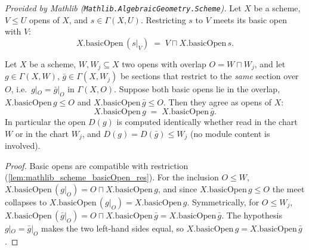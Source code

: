 \begin{lemma}
  \label{lem:mathlib_scheme_basicOpen_res}
  \mathlibok
  \textit{Provided by Mathlib (\texttt{Mathlib.AlgebraicGeometry.Scheme}).}
  Let \(X\) be a scheme, \(V \le U\) opens of \(X\), and \(s \in \Gamma(X, U)\). Restricting
  \(s\) to \(V\) meets its basic open with \(V\):
  \[
    X.\mathrm{basicOpen}\,(s|_V) \;=\; V \sqcap X.\mathrm{basicOpen}\,s .
  \]
\end{lemma}

\begin{lemma}
  \label{lem:gf_crossChart_basicOpen_eq}
  Let \(X\) be a scheme, \(W, W_j \subseteq X\) two opens with overlap
  \(O = W \sqcap W_j\), and let \(g \in \Gamma(X, W)\), \(\bar g \in \Gamma(X, W_j)\) be sections
  that restrict to the \emph{same} section over \(O\), i.e.\ \(g|_O = \bar g|_O\) in
  \(\Gamma(X, O)\). Suppose both basic opens lie in the overlap,
  \(X.\mathrm{basicOpen}\,g \le O\) and \(X.\mathrm{basicOpen}\,\bar g \le O\). Then they agree as
  opens of \(X\):
  \[
    X.\mathrm{basicOpen}\,g \;=\; X.\mathrm{basicOpen}\,\bar g .
  \]
  In particular the open \(D(g)\) is computed identically whether read in the chart \(W\) or in
  the chart \(W_j\), and \(D(g) = D(\bar g) \le W_j\) (no module content is involved).
\end{lemma}

\begin{proof}
  \leanok
  Basic opens are compatible with restriction (\cref{lem:mathlib_scheme_basicOpen_res}). For the
  inclusion \(O \le W\), \(X.\mathrm{basicOpen}\,(g|_O) = O \sqcap X.\mathrm{basicOpen}\,g\), and
  since \(X.\mathrm{basicOpen}\,g \le O\) the meet collapses to
  \(X.\mathrm{basicOpen}\,(g|_O) = X.\mathrm{basicOpen}\,g\). Symmetrically, for \(O \le W_j\),
  \(X.\mathrm{basicOpen}\,(\bar g|_O) = O \sqcap X.\mathrm{basicOpen}\,\bar g
  = X.\mathrm{basicOpen}\,\bar g\). The hypothesis \(g|_O = \bar g|_O\) makes the two left-hand
  sides equal, so \(X.\mathrm{basicOpen}\,g = X.\mathrm{basicOpen}\,\bar g\).
\end{proof}

